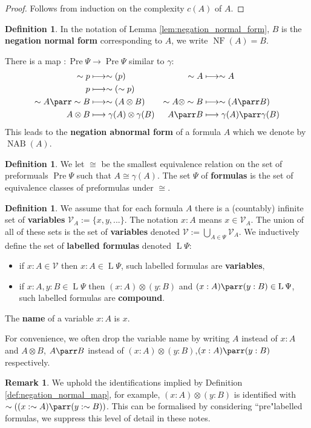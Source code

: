 \documentclass[12pt]{article}
\theoremstyle{plain}
\theoremstyle{definition}
\newtheorem{defn}[thm]{Definition} %
\newtheorem{remark}[thm]{Remark}
\newcommand{\call}[1]{\mathcal{#1}}
\newcommand{\lto}{\longrightarrow}
\newcommand{\negation}{\sim}
\begin{document}
\begin{proof}
Follows from induction on the complexity $c(A)$ of $A$.
\end{proof}
\begin{defn}
In the notation of Lemma \ref{lem:negation_normal_form}, $B$ is the \textbf{negation normal form} corresponding to $A$, we write $\operatorname{NF}(A) = B$.

There is a map $: \operatorname{Pre}\Psi \lto \operatorname{Pre}\Psi$ similar to $\gamma$:
\begin{align*}
    \negation p &\longmapsto \negation (p) & \negation A &\longmapsto \negation A\\
    p &\longmapsto \negation (\negation p) \\
    \negation A \parr \negation B&\longmapsto  \negation (A \otimes B) & \negation A \otimes \negation B &\longmapsto \negation (A \parr B) \\
    A \otimes B &\longmapsto \gamma(A) \otimes \gamma(B) & A \parr B &\longmapsto \gamma(A) \parr \gamma(B)
\end{align*}
This leads to the \textbf{negation abnormal form} of a formula $A$ which we denote by $\operatorname{NAB}(A)$.
\end{defn}
\begin{defn}
We let $\cong$ be the smallest equivalence relation on the set of preformuals $\operatorname{Pre}\Psi$ such that $A \cong \gamma(A)$. The set $\Psi$ of \textbf{formulas} is the set of equivalence classes of preformulas under $\cong$.
\end{defn}
\begin{defn}\label{def:labelled_formulas}
We assume that for each formula $A$ there is a (countably) infinite set of \textbf{variables} $\call{V}_{A} := \lbrace x, y,...\rbrace$. The notation $x : A$ means $x \in \call{V}_A$. The union of all of these sets is the set of \textbf{variables} denoted $\call{V}:=\bigcup_{A \in \Psi}\call{V}_A$. We inductively define the set of \textbf{labelled formulas} denoted $\operatorname{L}\Psi$:
\begin{itemize}
\item if $x:A \in \call{V}$ then $x:A \in \operatorname{L}\Psi$, such labelled formulas are \textbf{variables},
\item if $x:A, y:B \in \operatorname{L}\Psi$ then $(x:A) \otimes (y:B)$ and $(x:A) \parr (y:B) \in \operatorname{L}\Psi$, such labelled formulas are \textbf{compound}.
\end{itemize}
The \textbf{name} of a variable $x:A$ is $x$.

For convenience, we often drop the variable name by writing $A$ instead of $x:A$ and $A \otimes B$, $A \parr B$ instead of $(x:A) \otimes (y:B)$,$(x:A) \parr (y:B)$ respectively. 
\begin{remark}\label{rmk:pre_labelled_formulas}
We uphold the identifications implied by Definition \ref{def:negation_normal_map}, for example, $(x:A)\otimes(y:B)$ is identified with $\negation((x:\negation A) \parr (y:\negation B))$. This can be formalised by considering ``pre"labelled formulas, we suppress this level of detail in these notes.
\end{remark}
\end{defn}
\end{document}
